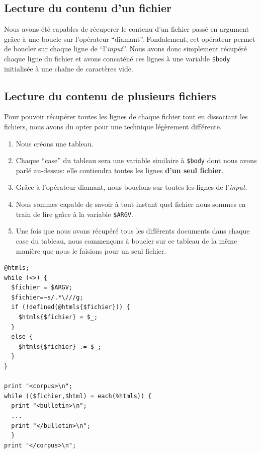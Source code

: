 \subsection{Lecture du contenu d'un fichier}

Nous avons été capables de récuperer le contenu d'un fichier passé en argument grâce à une boucle sur l'opérateur ``diamant''. Fondalement, cet opérateur permet de boucler sur chaque ligne de ``l'\textit{input}''. Nous avons donc simplement récupéré chaque ligne du fichier et avons concaténé ces lignes à une variable \lstinline{$body} initialisée à une chaîne de caractères vide.

\subsection{Lecture du contenu de plusieurs fichiers}

Pour pouvoir récupérer toutes les lignes de chaque fichier tout en dissociant les fichiers, nous avons du opter pour une technique légèrement différente.

\begin{enumerate}
  \item Nous créons une tableau.
  \item Chaque ``case'' du tableau sera une variable similaire à \lstinline{$body} dont nous avons parlé au-dessus: elle contiendra toutes les lignes \textbf{d'un seul fichier}.
  \item Grâce à l'opérateur diamant, nous bouclons sur toutes les lignes de l'\textit{input}.
  \item Nous sommes capable de savoir à tout instant quel fichier nous sommes en train de lire grâce à la variable \lstinline{$ARGV}.
  \item Une fois que nous avons récupéré tous les différents documents dans chaque case du tableau, nous commençons à boucler sur ce tableau de la même manière que nous le faisions pour un seul fichier.
\end{enumerate}

\perl
\begin{lstlisting}
@htmls;
while (<>) {
  $fichier = $ARGV;
  $fichier=~s/.*\///g;
  if (!defined(@htmls{$fichier})) {
    $htmls{$fichier} = $_;
  }
  else {
    $htmls{$fichier} .= $_;
  }
}

print "<corpus>\n";
while (($fichier,$html) = each(%htmls)) {
  print "<bulletin>\n";
  ...
  print "</bulletin>\n";
  }
print "</corpus>\n";
\end{lstlisting}

